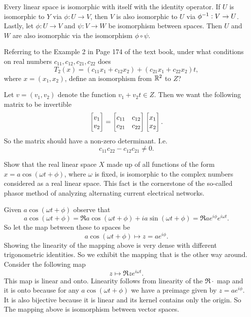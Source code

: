 \begin{solution}
	Every linear space is isomorphic with itself with the identity operator. If $ U $ is isomorphic to $ Y $ via $ \phi:U\to V $, then $ V $ is also isomorphic to $ U $ via $ \phi^{-1}:V\to U $. Lastly, let $ \phi:U\to V $ and $ \psi: V\to W $ be isomorphism between spaces. Then $ U $ and $ W $ are also isomorphic via the isomorphism $ \phi\circ \psi $.  
\end{solution}

\begin{problem}
	Referring to the Example 2 in Page 174 of the text book, under what conditions on real numbers $ c_{11},c_{12},c_{21},c_{22} $ does
	\[ T_2(x) = (c_{11}x_1 + c_{12}x_2) + (c_{21}x_1 + c_{22}x_2)t,\]
	where $ x=(x_1,x_2) $, define an isomorphism from $ \mathbb{R}^2 $ to $ Z $?
\end{problem}

\begin{solution}
	Let $ v=(v_1,v_2) $ denote the function $ v_1+v_2t \in Z $. Then we want the following matrix to be invertible
	\[ \begin{bmatrix} v_1 \\ v_2 \end{bmatrix} = \begin{bmatrix} c_{11} & c_{12} \\ c_{21} & c_{22} \end{bmatrix}\begin{bmatrix} x_1 \\ x_2 \end{bmatrix}. \]
	So the matrix should have a non-zero determinant. I.e.
	\[ c_{11}c_{22} - c_{12}c_{21} \neq 0. \]
\end{solution}

\begin{problem}
	Show that the real linear space $ X $ made up of all functions of the form $ x = a\cos(\omega t+\phi) $, where $ \omega $ is fixed, is isomorphic to the complex numbers considered as a real linear space. This fact is the cornerstone of the so-called phasor method of analyzing alternating current electrical networks.
\end{problem}
\begin{solution}
	Given $ a\cos(\omega t+\phi) $ observe that
	\[ a\cos(\omega t+\phi) = \Re{a\cos(\omega t+\phi) + ia\sin(\omega t+\phi)} = \Re{ae^{i\phi}e^{i\omega t}}. \]
	So let the map between these to spaces be
	\[ a\cos(\omega t+\phi) \mapsto z=ae^{i\phi}. \]
	Showing the linearity of the mapping above is very dense with different trigonometric identities. So we exhibit the mapping that is the other way around. Consider the following map
	\[ z \mapsto \Re{ze^{i\omega t}}. \]
	This map is linear and onto. Linearity follows from linearity of the $ \Re{\cdot} $ map and it is onto because for any $ a\cos(\omega t + \phi) $ we have a preimage given by $ z = ae^{i\phi} $. It is also bijective because it is linear and its kernel contains only the origin. So The mapping above is isomorphism between vector spaces.
\end{solution}

